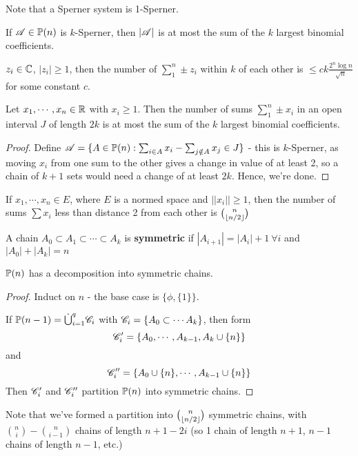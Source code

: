 \documentclass[a4paper]{article}
\begin{document}
Note that a Sperner system is 1-Sperner.

\begin{cor}[4, Erd\H{o}s, 1945]
	If $\A\in\P(n)$ is $k$-Sperner, then $|\A|$ is at most the sum of the $k$ largest binomial coefficients.
\end{cor}

\begin{thm}
	$z_i\in\C$, $\left|z_i\right|\geq 1$, then the number of $\sum_1^n\pm z_i$ within $k$ of each other is $\leq ck\frac{2^n\log n}{\sqrt{n}}$ for some constant $c$.
\end{thm}

\begin{thm}[5, Erd\H{o}s, 1945]
	Let $x_1,\cdots, x_n\in\R$ with $x_i\geq1$. Then the number of sums $\sum_1^n\pm x_i$ in an open interval $J$ of length $2k$ is at most the sum of the $k$ largest binomial coefficients.
\end{thm}
\begin{proof}
	Define $\A=\{A\in\P(n) : \sum_{i\in A}x_i - \sum_{j\notin A}x_j\in J\}$ - this is $k$-Sperner, as moving $x_i$ from one sum to the other gives a change in value of at least 2, so a chain of $k+1$ sets would need a change of at least $2k$. Hence, we're done.
\end{proof}

\begin{conj}[Erd\H{o}s, 1945]
	If $x_1,\cdots,x_n\in E$, where $E$ is a normed space and $\left|\left|x_i\right|\right|\geq1$, then the number of sums $\sum x_i$ less than distance 2 from each other is $\binom{n}{\lf n/2 \rf}$
\end{conj}

\begin{defi}
	A chain $A_0\subset A_1\subset \cdots \subset A_k$ is \textbf{symmetric} if $\left|A_{i+1}\right|=\left|A_{i}\right|+1\ \forall i$ and $\left|A_0\right|+\left|A_k\right|=n$
\end{defi}

\begin{thm}
	$\P(n)$ has a decomposition into symmetric chains.
\end{thm}
\begin{proof}
	Induct on $n$ - the base case is $\{\phi,\{1\}\}$.
	
	If $\P(n-1)=\dot{\bigcup}_{i=1}^{q}\calC_i$ with $\calC_i = \left\{A_0\subset\cdots A_k\right\}$, then form $$\calC_i'=\left\{A_0,\cdots,A_{k-1},A_k\cup\{n\}\right\}$$
	and $$\calC_i''=\left\{A_0\cup\{n\},\cdots,A_{k-1}\cup\{n\}\right\}$$
	Then $\calC_i'$ and $\calC_i''$ partition $\P(n)$ into symmetric chains.
\end{proof}
\begin{rem}
	Note that we've formed a partition into $\binom{n}{\lf n/2\rf}$ symmetric chains, with $\binom{n}{i}-\binom{n}{i-1}$ chains of length $n+1-2i$ (so 1 chain of length $n+1$, $n-1$ chains of length $n-1$, etc.)
\end{rem}
\end{document}
